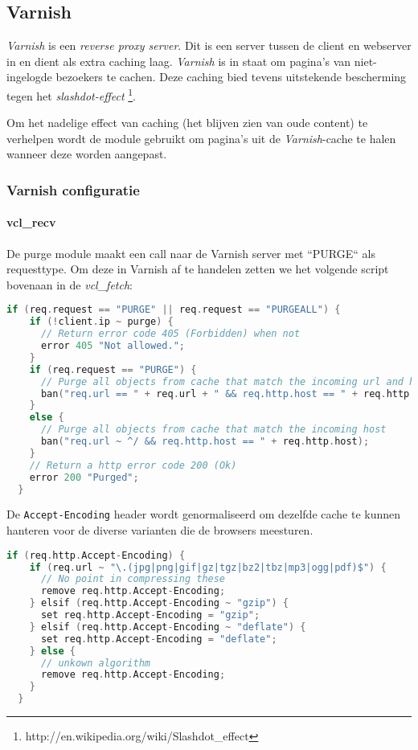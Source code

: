 \subsection{Varnish}\label{varnish}
\textit{Varnish} is een \textit{reverse proxy server}. Dit is een server tussen de client en webserver in en dient als extra caching laag.
\textit{Varnish} is in staat om pagina's van niet-ingelogde bezoekers te cachen. Deze caching bied tevens uitstekende bescherming tegen het \textit{slashdot-effect} \footnote{http://en.wikipedia.org/wiki/Slashdot\_effect}.

Om het nadelige effect van caching (het blijven zien van oude content) te verhelpen wordt de  module gebruikt om pagina's uit de \textit{Varnish}-cache te halen wanneer deze worden aangepast.

\subsubsection{Varnish configuratie}

\paragraph{vcl\_recv}\label{varnishrecv}

De purge module maakt een call naar de Varnish server met ``PURGE`` als requesttype. Om deze in Varnish af te handelen zetten we het volgende script bovenaan in de \textit{vcl\_fetch}:

\begin{lstlisting}[language=C]
  if (req.request == "PURGE" || req.request == "PURGEALL") {
    if (!client.ip ~ purge) {
      // Return error code 405 (Forbidden) when not
      error 405 "Not allowed.";
    }
    if (req.request == "PURGE") {
      // Purge all objects from cache that match the incoming url and host
      ban("req.url == " + req.url + " && req.http.host == " + req.http.host);
    }
    else {
      // Purge all objects from cache that match the incoming host
      ban("req.url ~ ^/ && req.http.host == " + req.http.host);
    }
    // Return a http error code 200 (Ok)
    error 200 "Purged";
  }
\end{lstlisting}

De \texttt{Accept-Encoding} header wordt genormaliseerd om dezelfde cache te kunnen hanteren voor de diverse varianten die de browsers meesturen.

\begin{lstlisting}[language=C]
  if (req.http.Accept-Encoding) {
    if (req.url ~ "\.(jpg|png|gif|gz|tgz|bz2|tbz|mp3|ogg|pdf)$") {
      // No point in compressing these
      remove req.http.Accept-Encoding;
    } elsif (req.http.Accept-Encoding ~ "gzip") {
      set req.http.Accept-Encoding = "gzip";
    } elsif (req.http.Accept-Encoding ~ "deflate") {
      set req.http.Accept-Encoding = "deflate";
    } else {
      // unkown algorithm
      remove req.http.Accept-Encoding;
    }
  }
\end{lstlisting}

